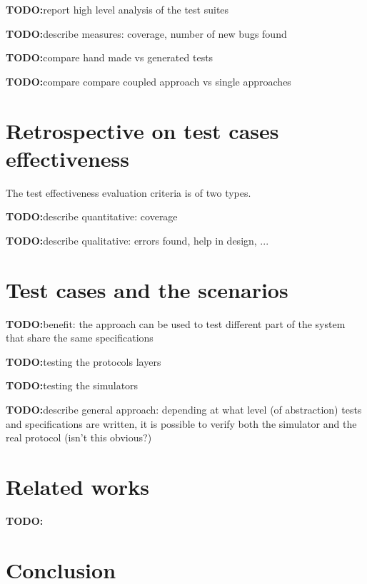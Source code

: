\documentclass{article}
\newcommand{\todo}{\textbf{TODO:}}
\begin{document}
\todo report high level analysis of the test suites

\todo describe measures: coverage, number of new bugs found

\todo compare hand made vs generated tests

\todo compare compare coupled approach vs single approaches



\section{Retrospective on test cases effectiveness}
\label{sec:test_cases_retrospectives}

The test effectiveness evaluation criteria is of two types. 

\todo describe quantitative: coverage

\todo describe qualitative: errors found, help in design, ...

\section{Test cases and the scenarios}
\label{sec:test_cases_and_the_scenarios}

\todo benefit: the approach can be used to test different part of the system
that share the same specifications

\todo testing the protocols layers

\todo testing the simulators

\todo describe general approach: depending at what level (of abstraction) tests 
and specifications are written, it is possible to verify both the simulator and 
the real protocol (isn't this obvious?)


\section{Related works}
\label{sec:related_works}

\todo

\section{Conclusion}
\label{sec:conclusion}
\end{document}

